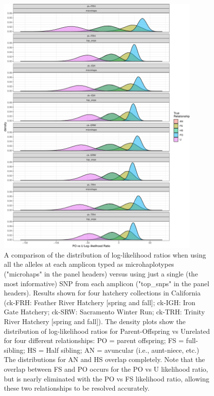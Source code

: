\begin{figure}
\begin{center}
\includegraphics[width=0.9\textwidth]{images/cmkr-comp-figure-crop.pdf}
\end{center}
\caption[Comparison of microhaplotypes vs.~best SNP in each amplicon]{\footnotesize 
A comparison of the distribution of log-likelihood ratios when using all the alleles at each
amplicon typed as microhaplotypes ("microhaps" in the panel headers) versus using just a single (the most informative) SNP from each
amplicon ("top\_snps" in the panel headers).  Results shown for four hatchery collections in California 
(ck-FRH: Feather River Hatchery [spring and fall]; ck-IGH: Iron Gate Hatchery; ck-SRW: Sacramento Winter Run;
ck-TRH: Trinity River Hatchery [spring and fall]).  The density plots show
the distribution of log-likelihood ratios for Parent-Offspring vs Unrelated for four different relationships:
PO = parent offspring; FS = full-sibling; HS = Half sibling; AN = avuncular (i.e., aunt-niece, etc.)
The distributions for AN and HS overlap completely.  Note that the overlap between FS and PO occurs
for the PO vs U likelihood ratio, but is nearly eliminated with the PO vs FS likelihood ratio, allowing these
two relationships to be resolved accurately.}
\label{fig:ckmr-comp}
\end{figure}

